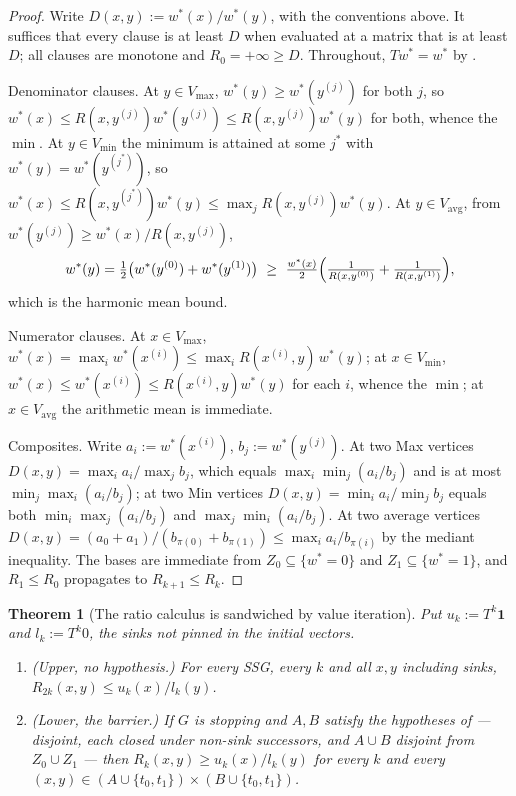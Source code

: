 \documentclass[11pt]{article}
\theoremstyle{plain}
\newtheorem{theorem}{Theorem}[section]
\theoremstyle{definition}
\newcommand{\Vmax}{V_{\max}}
\newcommand{\Vmin}{V_{\min}}
\newcommand{\Vavg}{V_{\mathrm{avg}}}
\newcommand{\bbone}{\mathbf{1}}
\begin{document}
\begin{proof}
Write $D(x,y):=w^\ast(x)/w^\ast(y)$, with the conventions above. It
suffices that every clause is at least $D$ when evaluated at a matrix
that is at least $D$; all clauses are monotone and $R_0=+\infty\ge D$.
Throughout, $Tw^\ast=w^\ast$ by .

Denominator clauses. At $y\in\Vmax$, $w^\ast(y)\ge w^\ast(y^{(j)})$ for
both $j$, so $w^\ast(x)\le R(x,y^{(j)})w^\ast(y^{(j)})\le
R(x,y^{(j)})w^\ast(y)$ for both, whence the $\min$. At $y\in\Vmin$ the
minimum is attained at some $j^\ast$ with $w^\ast(y)=w^\ast(y^{(j^\ast)})$,
so $w^\ast(x)\le R(x,y^{(j^\ast)})w^\ast(y)\le\max_jR(x,y^{(j)})w^\ast(y)$.
At $y\in\Vavg$, from $w^\ast(y^{(j)})\ge w^\ast(x)/R(x,y^{(j)})$,
\[
  w^\ast(y)=\tfrac12\bigl(w^\ast(y^{(0)})+w^\ast(y^{(1)})\bigr)
  \ \ge\ \tfrac{w^\ast(x)}2\Bigl(\tfrac1{R(x,y^{(0)})}+\tfrac1{R(x,y^{(1)})}\Bigr),
\]
which is the harmonic mean bound.

Numerator clauses. At $x\in\Vmax$, $w^\ast(x)=\max_iw^\ast(x^{(i)})\le
\max_iR(x^{(i)},y)\,w^\ast(y)$; at $x\in\Vmin$, $w^\ast(x)\le w^\ast(x^{(i)})
\le R(x^{(i)},y)w^\ast(y)$ for each $i$, whence the $\min$; at
$x\in\Vavg$ the arithmetic mean is immediate.

Composites. Write $a_i:=w^\ast(x^{(i)})$, $b_j:=w^\ast(y^{(j)})$. At two
Max vertices $D(x,y)=\max_ia_i/\max_jb_j$, which equals
$\max_i\min_j(a_i/b_j)$ and is at most $\min_j\max_i(a_i/b_j)$; at two
Min vertices $D(x,y)=\min_ia_i/\min_jb_j$ equals both
$\min_i\max_j(a_i/b_j)$ and $\max_j\min_i(a_i/b_j)$. At two average
vertices $D(x,y)=(a_0+a_1)/(b_{\pi(0)}+b_{\pi(1)})\le\max_i a_i/b_{\pi(i)}$
by the mediant inequality. The bases are immediate from
$Z_0\subseteq\{w^\ast=0\}$ and $Z_1\subseteq\{w^\ast=1\}$, and
$R_1\le R_0$ propagates to $R_{k+1}\le R_k$.
\end{proof}

\begin{theorem}[The ratio calculus is sandwiched by value
iteration]\label{thm:ratio-sandwich}
Put $u_k:=T^k\bbone$ and $l_k:=T^k0$, the sinks not pinned in the initial
vectors.
\begin{enumerate}[label=(\alph*),leftmargin=2.2em]
\item \textup{(Upper, no hypothesis.)} For every SSG, every $k$ and all
      $x,y$ including sinks, $R_{2k}(x,y)\le u_k(x)/l_k(y)$.
\item \textup{(Lower, the barrier.)} If $G$ is stopping and $A,B$ satisfy
      the hypotheses of  --- disjoint, each closed
      under non-sink successors, and $A\cup B$ disjoint from
      $Z_0\cup Z_1$ --- then $R_k(x,y)\ge u_k(x)/l_k(y)$ for every $k$ and
      every $(x,y)\in(A\cup\{t_0,t_1\})\times(B\cup\{t_0,t_1\})$.
\end{enumerate}
\end{theorem}
\end{document}
